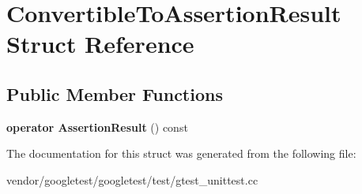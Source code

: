 \hypertarget{struct_convertible_to_assertion_result}{}\section{Convertible\+To\+Assertion\+Result Struct Reference}
\label{struct_convertible_to_assertion_result}
\subsection*{Public Member Functions}
\begin{DoxyCompactItemize}
\item 
\mbox{\label{struct_convertible_to_assertion_result_a0f816f2f25ecaf29a95b3cfd4033e105}} 
{\bfseries operator Assertion\+Result} () const
\end{DoxyCompactItemize}


The documentation for this struct was generated from the following file\+:\begin{DoxyCompactItemize}
\item 
vendor/googletest/googletest/test/gtest\+\_\+unittest.\+cc\end{DoxyCompactItemize}
